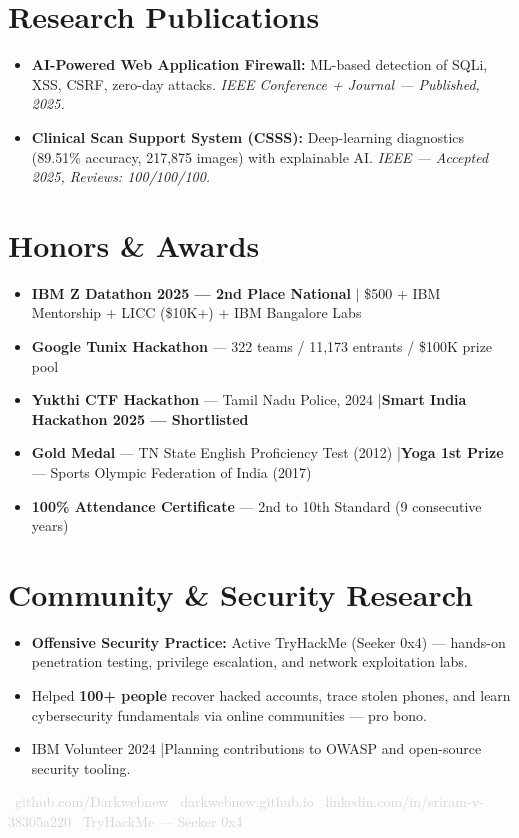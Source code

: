 \documentclass[9.5pt, letterpaper]{article}
\begin{document}
\section{Research Publications}
\vspace{1pt}
\begin{itemize}
  \item \textbf{AI-Powered Web Application Firewall:} ML-based detection of SQLi, XSS, CSRF, zero-day attacks. \textit{IEEE Conference + Journal --- Published, 2025.}
  \item \textbf{Clinical Scan Support System (CSSS):} Deep-learning diagnostics (89.51\% accuracy, 217,875 images) with explainable AI. \textit{IEEE --- Accepted 2025, Reviews: 100/100/100.}
\end{itemize}

\section{Honors \& Awards}
\vspace{1pt}
\begin{itemize}
  \item \textbf{IBM Z Datathon 2025 --- 2nd Place National} $|$ \$500 + IBM Mentorship + LICC (\$10K+) + IBM Bangalore Labs
  \item \textbf{Google Tunix Hackathon} --- 322 teams / 11,173 entrants / \$100K prize pool
  \item \textbf{Yukthi CTF Hackathon} --- Tamil Nadu Police, 2024 \enspace|\enspace \textbf{Smart India Hackathon 2025 --- Shortlisted}
  \item \textbf{Gold Medal} --- TN State English Proficiency Test (2012) \enspace|\enspace \textbf{Yoga 1st Prize} --- Sports Olympic Federation of India (2017)
  \item \textbf{100\% Attendance Certificate} --- 2nd to 10th Standard (9 consecutive years)
\end{itemize}

\section{Community \& Security Research}
\vspace{1pt}
\begin{itemize}
  \item \textbf{Offensive Security Practice:} Active TryHackMe (Seeker 0x4) — hands-on penetration testing, privilege escalation, and network exploitation labs.
  \item Helped \textbf{100+ people} recover hacked accounts, trace stolen phones, and learn cybersecurity fundamentals via online communities — pro bono.
  \item IBM Volunteer 2024 \enspace|\enspace Planning contributions to OWASP and open-source security tooling.
\end{itemize}

\vspace{8pt}
\begin{center}
  \textcolor{lightgray}{\footnotesize
    \faGithub\ github.com/Darkwebnew \quad
    \faGlobe\ darkwebnew.github.io \quad
    \faLinkedin\ linkedin.com/in/sriram-v-38305a220 \quad
    \faShield\ TryHackMe --- Seeker 0x4
  }
\end{center}
\end{document}
